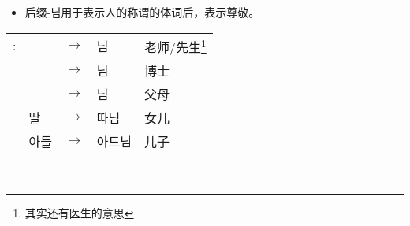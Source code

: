 \begin{grammar}
\begin{grammarsect}[\kr -(으){}시-]
\begin{itemize}
            \item 后缀{\kr -님}用于表示人的称谓的体词后，表示尊敬。
        \end{itemize}
        \begin{tabular}{lllll}
            \kr \ruby{例}{예}:&\kr \ruby{先生}{선생}&$\to$&\kr  \ruby{先生}{선생}님 &老师/先生\footnote{其实还有医生的意思}\\
            &\kr \ruby{博士}{박사} &$\to$&\kr  \ruby{博士}{박사}님 &博士 \\
            &\kr \ruby{父母}{부모} &$\to$&\kr  \ruby{父母}{부모}님 &父母 \\
            &\kr 딸&$\to$&\kr  따님 &女儿 \\
            &\kr 아들 &$\to$&\kr  아드님 &儿子
        \end{tabular}\\
    \end{grammarsect}
\end{grammar}
